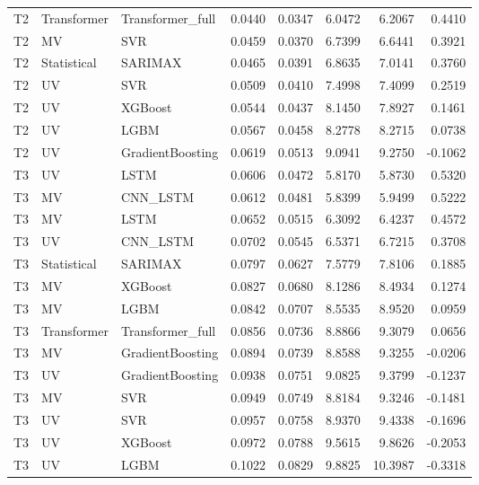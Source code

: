 \begin{table}
\begin{tabular}{lllrrrrr}
T2 & Transformer & Transformer\_full & 0.0440 & 0.0347 & 6.0472 & 6.2067 & 0.4410 \\
T2 & MV & SVR & 0.0459 & 0.0370 & 6.7399 & 6.6441 & 0.3921 \\
T2 & Statistical & SARIMAX & 0.0465 & 0.0391 & 6.8635 & 7.0141 & 0.3760 \\
T2 & UV & SVR & 0.0509 & 0.0410 & 7.4998 & 7.4099 & 0.2519 \\
T2 & UV & XGBoost & 0.0544 & 0.0437 & 8.1450 & 7.8927 & 0.1461 \\
T2 & UV & LGBM & 0.0567 & 0.0458 & 8.2778 & 8.2715 & 0.0738 \\
T2 & UV & GradientBoosting & 0.0619 & 0.0513 & 9.0941 & 9.2750 & -0.1062 \\
T3 & UV & LSTM & 0.0606 & 0.0472 & 5.8170 & 5.8730 & 0.5320 \\
T3 & MV & CNN\_LSTM & 0.0612 & 0.0481 & 5.8399 & 5.9499 & 0.5222 \\
T3 & MV & LSTM & 0.0652 & 0.0515 & 6.3092 & 6.4237 & 0.4572 \\
T3 & UV & CNN\_LSTM & 0.0702 & 0.0545 & 6.5371 & 6.7215 & 0.3708 \\
T3 & Statistical & SARIMAX & 0.0797 & 0.0627 & 7.5779 & 7.8106 & 0.1885 \\
T3 & MV & XGBoost & 0.0827 & 0.0680 & 8.1286 & 8.4934 & 0.1274 \\
T3 & MV & LGBM & 0.0842 & 0.0707 & 8.5535 & 8.9520 & 0.0959 \\
T3 & Transformer & Transformer\_full & 0.0856 & 0.0736 & 8.8866 & 9.3079 & 0.0656 \\
T3 & MV & GradientBoosting & 0.0894 & 0.0739 & 8.8588 & 9.3255 & -0.0206 \\
T3 & UV & GradientBoosting & 0.0938 & 0.0751 & 9.0825 & 9.3799 & -0.1237 \\
T3 & MV & SVR & 0.0949 & 0.0749 & 8.8184 & 9.3246 & -0.1481 \\
T3 & UV & SVR & 0.0957 & 0.0758 & 8.9370 & 9.4338 & -0.1696 \\
T3 & UV & XGBoost & 0.0972 & 0.0788 & 9.5615 & 9.8626 & -0.2053 \\
T3 & UV & LGBM & 0.1022 & 0.0829 & 9.8825 & 10.3987 & -0.3318 \\
\bottomrule
\end{tabular}
\end{table}
